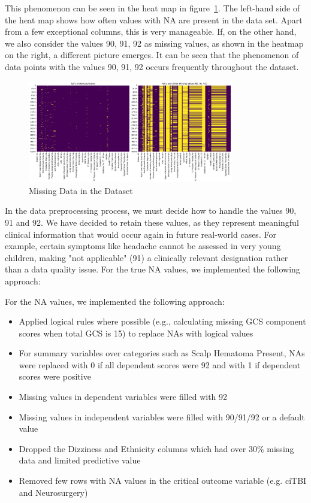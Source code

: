 \documentclass[10pt,letterpaper]{article}
\begin{document}
This phenomenon can be seen in the heat map in figure~\ref{fig:missing_data}. The left-hand side of the heat map shows how often values with NA are present in the data set. Apart from a few exceptional columns, this is very manageable. If, on the other hand, we also consider the values 90, 91, 92 as missing values, as shown in the heatmap on the right, a different picture emerges. It can be seen that the phenomenon of data points with the values 90, 91, 92 occurs frequently throughout the dataset.

\begin{figure}[H]
    \centering
    \includegraphics[width=0.8\textwidth]{../figs/missing_values.png} %
    \caption{Missing Data in the Dataset}
    \label{fig:missing_data}
\end{figure}

In the data preprocessing process, we must decide how to handle the values 90, 91 and 92. We have decided to retain these values, as they represent meaningful clinical information that would occur again in future real-world cases. For example, certain symptoms like headache cannot be assessed in very young children, making "not applicable" (91) a clinically relevant designation rather than a data quality issue.
For the true NA values, we implemented the following approach:

For the NA values, we implemented the following approach:
\begin{itemize}
\item Applied logical rules where possible (e.g., calculating missing GCS component scores when total GCS is 15) to replace NAs with logical values
\item For summary variables over categories such as Scalp Hematoma Present, NAs were replaced with 0 if all dependent scores were 92 and with 1 if dependent scores were positive
\item Missing values in dependent variables were filled with 92
\item Missing values in independent variables were filled with 90/91/92 or a default value 
\item Dropped the Dizziness and Ethnicity columns which had over 30\% missing data and limited predictive value
\item Removed few rows with NA values in the critical outcome variable (e.g. ciTBI and Neurosurgery)
\end{itemize}
\end{document}
